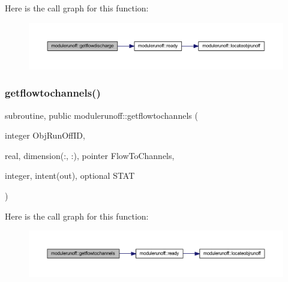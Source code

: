 Here is the call graph for this function\+:
\nopagebreak
\begin{figure}[H]
\begin{center}
\leavevmode
\includegraphics[width=350pt]{namespacemodulerunoff_a35dbdf0f3737830c01b78496fc043851_cgraph}
\end{center}
\end{figure}
\mbox{\label{namespacemodulerunoff_af164eb766650a303ad4fbe9de7bcb541}} 
\subsubsection{\texorpdfstring{getflowtochannels()}{getflowtochannels()}}
{\footnotesize\ttfamily subroutine, public modulerunoff\+::getflowtochannels (\begin{DoxyParamCaption}\item[{integer}]{Obj\+Run\+Off\+ID,  }\item[{real, dimension(\+:, \+:), pointer}]{Flow\+To\+Channels,  }\item[{integer, intent(out), optional}]{S\+T\+AT }\end{DoxyParamCaption})}

Here is the call graph for this function\+:
\nopagebreak
\begin{figure}[H]
\begin{center}
\leavevmode
\includegraphics[width=350pt]{namespacemodulerunoff_af164eb766650a303ad4fbe9de7bcb541_cgraph}
\end{center}
\end{figure}
\mbox{\label{namespacemodulerunoff_a2cad42fe7c6c24a46f9a75f3528e8abb}} 
